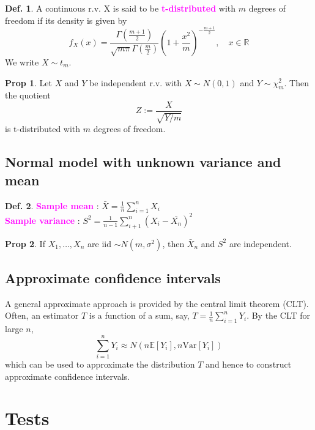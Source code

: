 \documentclass[8pt,a4paper,landscape]{article}
\theoremstyle{definition}
\newtheorem{definition}{Def.}[section]
\theoremstyle{example}
\theoremstyle{intuition}
\theoremstyle{definition}
\newtheorem{proposition}{Prop}[section]
\newcommand{\mydef}[1]{\textcolor{magenta}{\textbf{#1}}}
\newcommand{\expec}[1]{\mathbb{E}\left[ #1 \right]}
\begin{document}
\begin{multicols}{3}
				\begin{definition}
					A continuous r.v. X is said to be \mydef{t-distributed} with $m$ degrees of freedom if its density is given by 
					$$
						f_X(x) = \frac{\Gamma(\frac{m+1}{2})}{\sqrt{m\pi}\Gamma(\frac{m}{2})} \left( 1 + \frac{x^2}{m} \right)^{-\frac{m+1}{2}}, \quad x \in \mathbb{R}
					$$
					We write $X \sim t_m$.
				\end{definition}

				\begin{proposition}
					Let $X$ and $Y$ be independent r.v. with $X \sim N(0,1)$ and $Y \sim \chi^2_m$. Then the quotient
					$$
						Z := \frac{X}{\sqrt{Y/m}}
					$$
					is t-distributed with $m$ degrees of freedom.
				\end{proposition}


			\subsection{Normal model with unknown variance and mean}
				\begin{definition}
					\mydef{Sample mean} : $\bar{X} = \frac{1}{n} \sum^n_{i=1}X_i$ \\
					\mydef{Sample variance} : $S^2 = \frac{1}{n-1} \sum^n_{i+1}(X_i - \bar{X_n})^2$
				\end{definition}

				\begin{proposition}
					If $X_1, \ldots, X_n$ are iid $\sim N(m, \sigma^2)$, then $\bar{X}_n$ and $S^2$ are independent.
				\end{proposition}


			\subsection{Approximate confidence intervals}
				A general approximate approach is provided by the central limit theorem (CLT). Often, an estimator $T$ is a function of a sum, say, $T = \frac{1}{n} \sum^n_{i=1} Y_i$. By the CLT for large $n$,
				$$
					\sum^n_{i = 1} Y_i \approx N\left(n\expec{Y_i}, n  \text{Var}[Y_i]\right)
				$$
				which can be used to approximate the distribution $T$ and hence to construct approximate confidence intervals.


		\section{Tests}

\end{multicols}
\end{document}
